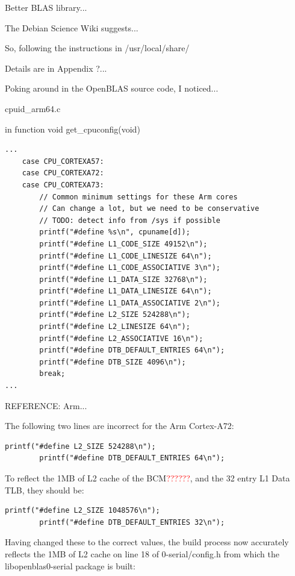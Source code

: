 \documentclass{report}
\begin{document}
Better BLAS library...

The Debian Science Wiki suggests...

So, following the instructions in /usr/local/share/

Details are in Appendix ?...

Poking around in the OpenBLAS source code, I noticed...

cpuid\_arm64.c

in function void get\_cpuconfig(void)


\lstset{style=listingstyle}
\begin{lstlisting}[caption=cpuid\_arm64.c, numbers=none]
...
	case CPU_CORTEXA57:
	case CPU_CORTEXA72:
	case CPU_CORTEXA73:
		// Common minimum settings for these Arm cores
		// Can change a lot, but we need to be conservative
		// TODO: detect info from /sys if possible
		printf("#define %s\n", cpuname[d]);
		printf("#define L1_CODE_SIZE 49152\n");
		printf("#define L1_CODE_LINESIZE 64\n");
		printf("#define L1_CODE_ASSOCIATIVE 3\n");
		printf("#define L1_DATA_SIZE 32768\n");
		printf("#define L1_DATA_LINESIZE 64\n");
		printf("#define L1_DATA_ASSOCIATIVE 2\n");
		printf("#define L2_SIZE 524288\n");
		printf("#define L2_LINESIZE 64\n");
		printf("#define L2_ASSOCIATIVE 16\n");
		printf("#define DTB_DEFAULT_ENTRIES 64\n");
		printf("#define DTB_SIZE 4096\n");
		break;
...
\end{lstlisting}

REFERENCE: Arm...

The following two lines are incorrect for the Arm Cortex-A72:

\lstset{style=listingstyle}
\begin{lstlisting}[numbers=none]
		printf("#define L2_SIZE 524288\n");
		printf("#define DTB_DEFAULT_ENTRIES 64\n");
\end{lstlisting}

To reflect the 1MB of L2 cache of the BCM\textcolor{red}{??????}, and the 32 entry L1 Data TLB, they should be:

\lstset{style=listingstyle}
\begin{lstlisting}[numbers=none]
		printf("#define L2_SIZE 1048576\n");
		printf("#define DTB_DEFAULT_ENTRIES 32\n");
\end{lstlisting}


Having changed these to the correct values, the build process now accurately reflects the 1MB of L2 cache on line 18 of 0-serial/config.h from which the libopenblas0-serial package is built:
\end{document}
